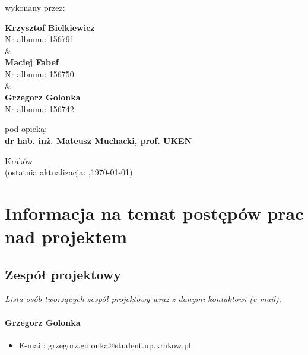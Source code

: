 \documentclass[12pt,a4paper,oneside]{article}
\theoremstyle{definition}
\numberwithin{equation}{section}
\begin{document}
\begin{titlepage}
\begin{center}
 {\fontsize{12pt}{12pt}\selectfont wykonany przez: }
\end{center}
\begin{center}
 {\bf\fontsize{16pt}{16pt}\selectfont Krzysztof Bielkiewicz}\\
 {\fontsize{12pt}{12pt}\selectfont Nr albumu: 156791 \\\&\\}
 {\bf\fontsize{16pt}{16pt}\selectfont Maciej Fabef}\\
 {\fontsize{12pt}{12pt}\selectfont Nr albumu: 156750\\\&\\}
 {\bf\fontsize{16pt}{16pt}\selectfont Grzegorz Golonka }\\
 {\fontsize{12pt}{12pt}\selectfont Nr albumu: 156742}
\end{center}
\begin{center}
 {\fontsize{12pt}{12pt}\selectfont pod opieką:}\\
 {\bf\fontsize{12pt}{12pt}\selectfont dr hab. inż. Mateusz Muchacki, prof. UKEN}
\end{center}

\vspace*{\fill}
\begin{center}
\large
Kraków \the\year\\
(ostatnia aktualizacja: \DTMcurrenttime,\;\today)
\end{center}
\end{titlepage}
\setcounter{page}{0} 
\newpage\null\thispagestyle{empty}

\tableofcontents


\newpage

\section{Informacja na temat postępów prac nad projektem}

\subsection{Zespół projektowy}
\textit{Lista osób tworzących zespół projektowy wraz z danymi kontaktowi (e-mail).}
    \paragraph{Grzegorz Golonka}
    \begin{itemize}
        \item E-mail: grzegorz.golonka@student.up.krakow.pl
    \end{itemize}
\end{document}
